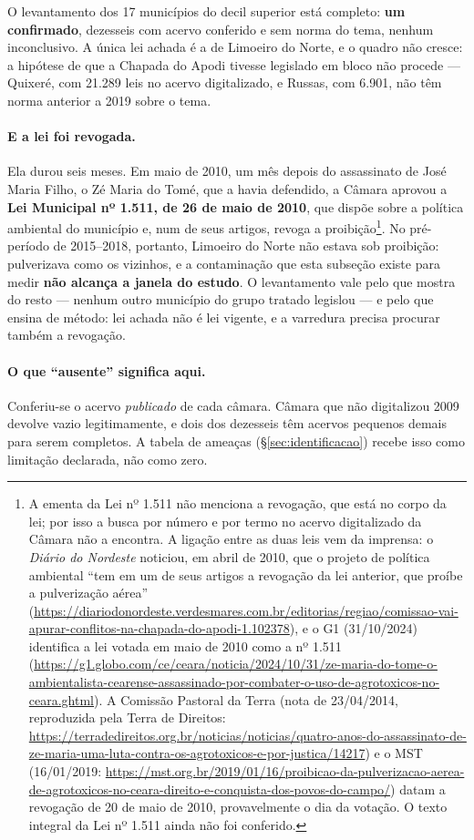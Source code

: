 O levantamento dos 17 municípios do decil superior está completo: \textbf{um
confirmado}, dezesseis com acervo conferido e sem norma do tema, nenhum
inconclusivo. A única lei achada é a de Limoeiro do Norte, e o quadro não
cresce: a hipótese de que a Chapada do Apodi tivesse legislado em bloco não
procede --- Quixeré, com 21.289 leis no acervo digitalizado, e Russas, com
6.901, não têm norma anterior a 2019 sobre o tema.

\paragraph{E a lei foi revogada.} Ela durou seis meses. Em maio de 2010, um
mês depois do assassinato de José Maria Filho, o Zé Maria do Tomé, que a havia
defendido, a Câmara aprovou a \textbf{Lei Municipal nº 1.511, de 26 de maio de
2010}, que dispõe sobre a política ambiental do município e, num de seus
artigos, revoga a proibição\footnote{A ementa da Lei nº 1.511 não menciona a
revogação, que está no corpo da lei; por isso a busca por número e por termo no
acervo digitalizado da Câmara não a encontra. A ligação entre as duas leis vem
da imprensa: o \emph{Diário do Nordeste} noticiou, em abril de 2010, que o
projeto de política ambiental ``tem em um de seus artigos a revogação da lei
anterior, que proíbe a pulverização aérea''
(\url{https://diariodonordeste.verdesmares.com.br/editorias/regiao/comissao-vai-apurar-conflitos-na-chapada-do-apodi-1.102378}),
e o G1 (31/10/2024) identifica a lei votada em maio de 2010 como a nº 1.511
(\url{https://g1.globo.com/ce/ceara/noticia/2024/10/31/ze-maria-do-tome-o-ambientalista-cearense-assassinado-por-combater-o-uso-de-agrotoxicos-no-ceara.ghtml}).
A Comissão Pastoral da Terra (nota de 23/04/2014, reproduzida pela Terra de
Direitos:
\url{https://terradedireitos.org.br/noticias/noticias/quatro-anos-do-assassinato-de-ze-maria-uma-luta-contra-os-agrotoxicos-e-por-justica/14217})
e o MST (16/01/2019:
\url{https://mst.org.br/2019/01/16/proibicao-da-pulverizacao-aerea-de-agrotoxicos-no-ceara-direito-e-conquista-dos-povos-do-campo/})
datam a revogação de 20 de maio de 2010, provavelmente o dia da votação. O
texto integral da Lei nº 1.511 ainda não foi conferido.}. No pré-período de
2015--2018, portanto, Limoeiro do Norte não estava sob proibição: pulverizava
como os vizinhos, e a contaminação que esta subseção existe para medir
\textbf{não alcança a janela do estudo}. O levantamento vale pelo que mostra do
resto --- nenhum outro município do grupo tratado legislou --- e pelo que ensina
de método: lei achada não é lei vigente, e a varredura precisa procurar também a
revogação.

\paragraph{O que ``ausente'' significa aqui.}
Conferiu-se o acervo \emph{publicado} de cada câmara. Câmara que não digitalizou
2009 devolve vazio legitimamente, e dois dos dezesseis têm acervos pequenos
demais para serem completos. A tabela de ameaças (§\ref{sec:identificacao})
recebe isso como limitação declarada, não como zero.
